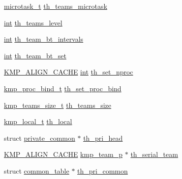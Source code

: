 \begin{DoxyCompactItemize}
\item 
\hyperlink{kmp__os_8h_a390eabec74d95ed005fb6979992598c8}{microtask\-\_\-t} \hyperlink{structkmp__base__info_a4da1ce47bc5e283cb4b8b2e88a152c51}{th\-\_\-teams\-\_\-microtask}
\item 
\hyperlink{ittnotify__static_8h_a8b8dcd723308a8cb5d84277c7a3fff70}{int} \hyperlink{structkmp__base__info_a8046bdfbf9417bb32e06ba1149a0c062}{th\-\_\-teams\-\_\-level}
\item 
\hyperlink{ittnotify__static_8h_a8b8dcd723308a8cb5d84277c7a3fff70}{int} \hyperlink{structkmp__base__info_a8b53d9a59e974d814d0d222ea6e3feb9}{th\-\_\-team\-\_\-bt\-\_\-intervals}
\item 
\hyperlink{ittnotify__static_8h_a8b8dcd723308a8cb5d84277c7a3fff70}{int} \hyperlink{structkmp__base__info_a0dc8b44fa2597832e4a954013c90cd30}{th\-\_\-team\-\_\-bt\-\_\-set}
\item 
\hyperlink{kmp__os_8h_a6830c178a3906c25cd0138d8365db070}{K\-M\-P\-\_\-\-A\-L\-I\-G\-N\-\_\-\-C\-A\-C\-H\-E} \hyperlink{ittnotify__static_8h_a8b8dcd723308a8cb5d84277c7a3fff70}{int} \hyperlink{structkmp__base__info_a0bd099be9aa241334bdfad0f92789bee}{th\-\_\-set\-\_\-nproc}
\item 
\hyperlink{kmp_8h_ae587debf3f0331e4f824daa05f47a241}{kmp\-\_\-proc\-\_\-bind\-\_\-t} \hyperlink{structkmp__base__info_ae85fa12e3aa227e4c734047fe2cadedd}{th\-\_\-set\-\_\-proc\-\_\-bind}
\item 
\hyperlink{kmp_8h_a8a920d283ccd36b0453b0a21d4a93c5e}{kmp\-\_\-teams\-\_\-size\-\_\-t} \hyperlink{structkmp__base__info_ab174e1ae25a32168047ae559f7bcd68a}{th\-\_\-teams\-\_\-size}
\item 
\hyperlink{kmp_8h_acde06dcc5e15f955a93b646d23393de9}{kmp\-\_\-local\-\_\-t} \hyperlink{structkmp__base__info_a28684ea3001b59465f162155f2743ca1}{th\-\_\-local}
\item 
struct \hyperlink{structprivate__common}{private\-\_\-common} $\ast$ \hyperlink{structkmp__base__info_a62a3010124c7c058c41b155a079e41bf}{th\-\_\-pri\-\_\-head}
\item 
\hyperlink{kmp__os_8h_a6830c178a3906c25cd0138d8365db070}{K\-M\-P\-\_\-\-A\-L\-I\-G\-N\-\_\-\-C\-A\-C\-H\-E} \hyperlink{kmp_8h_a2d72bf7a856130c6d2324db6367179a8}{kmp\-\_\-team\-\_\-p} $\ast$ \hyperlink{structkmp__base__info_a2511f7e8e7a8c505c3f27745e7cf7d3f}{th\-\_\-serial\-\_\-team}
\item 
struct \hyperlink{structcommon__table}{common\-\_\-table} $\ast$ \hyperlink{structkmp__base__info_aa2ed8a418357603a07a7d12b2d0750c3}{th\-\_\-pri\-\_\-common}

\end{DoxyCompactItemize}
